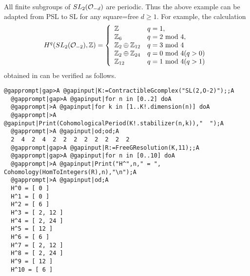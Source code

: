 \documentclass[a4paper,11pt]{report}
\begin{document}
{{\begin{Verbatim}[commandchars=@|A,fontsize=\small,frame=single,label=Example]
\end{Verbatim}
 All finite subgroups of $SL_2({\cal O}_{-d})$ are periodic. Thus the above example can be adapted from PSL to SL for any
square=free $d\ge 1$. For example, the calculation 
\[H^q(SL_2({\cal O}_{-2}),\mathbb Z) = \left\{\begin{array}{ll} \mathbb Z &
q=1,\\ \mathbb Z_6 & q=2 {\rm \ mod\ } 4,\\ \mathbb Z_2 \oplus \mathbb Z_{12}
& q= 3 {\rm \ mod\ } 4\\ \mathbb Z_2 \oplus \mathbb Z_{24} & q= 0 {\rm \ mod\
} 4 (q>0)\\ \mathbb Z_{12} & q= 1 {\rm \ mod\ } 4 (q > 1)\\ \end{array}\right. \]
 obtained in \cite{Schwermer} can be verified as follows. 
\begin{Verbatim}[commandchars=@|A,fontsize=\small,frame=single,label=Example]
  @gapprompt|gap>A @gapinput|K:=ContractibleGcomplex("SL(2,O-2)");;A
  @gapprompt|gap>A @gapinput|for n in [0..2] doA
  @gapprompt|>A @gapinput|for k in [1..K!.dimension(n)] doA
  @gapprompt|>A @gapinput|Print(CohomologicalPeriod(K!.stabilizer(n,k)),"  ");A
  @gapprompt|>A @gapinput|od;od;A
  2  4  2  4  2  2  2  2  2  2  2  2  
  @gapprompt|gap>A @gapinput|R:=FreeGResolution(K,11);;A
  @gapprompt|gap>A @gapinput|for n in [0..10] doA
  @gapprompt|>A @gapinput|Print("H^",n," = ", Cohomology(HomToIntegers(R),n),"\n");A
  @gapprompt|>A @gapinput|od;A
  H^0 = [ 0 ]
  H^1 = [ 0 ]
  H^2 = [ 6 ]
  H^3 = [ 2, 12 ]
  H^4 = [ 2, 24 ]
  H^5 = [ 12 ]
  H^6 = [ 6 ]
  H^7 = [ 2, 12 ]
  H^8 = [ 2, 24 ]
  H^9 = [ 12 ]
  H^10 = [ 6 ]
  

\end{Verbatim}}}
\end{document}
